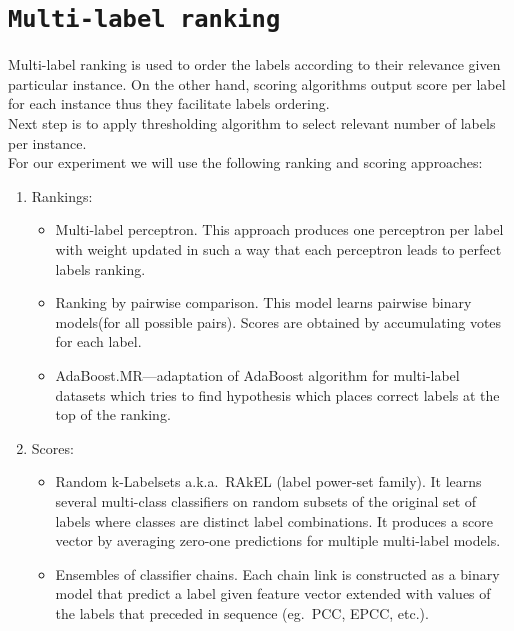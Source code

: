 \documentclass[12pt,a4paper,twocolumn]{article}
\begin{document}
\section*{\texttt{Multi-label ranking}}
Multi-label ranking is used to order the labels according to their relevance given particular instance. On the other hand, scoring algorithms output score per label for each instance thus they facilitate labels ordering.\\
Next step is to apply thresholding algorithm to select relevant number of labels per instance.\\
For our experiment we will use the following ranking and scoring approaches:

\begin{enumerate}
\item Rankings:
	\begin{itemize}
	\item Multi-label perceptron. This approach produces one perceptron per label with weight updated in such a way that each perceptron leads to perfect labels ranking. %
	\item Ranking by pairwise comparison. This model learns pairwise binary models(for all possible pairs). Scores are obtained by accumulating votes for each label. %
	\item AdaBoost.MR---adaptation of AdaBoost algorithm for multi-label datasets which tries to find hypothesis which places correct labels at the top of the ranking. %
	\end{itemize}
\item Scores:
	\begin{itemize}
	\item Random k-Labelsets a.k.a.\ RAkEL (label power-set family). It learns several multi-class classifiers on random subsets of the original set of labels where classes are distinct label combinations. It produces a score vector by averaging zero-one predictions for multiple multi-label models. %
	\item Ensembles of classifier chains. Each chain link is constructed as a binary model that predict a label given feature vector extended with values of the labels that preceded in sequence (eg.\ PCC, EPCC, etc.). %
	\end{itemize}
\end{enumerate}
\end{document}
